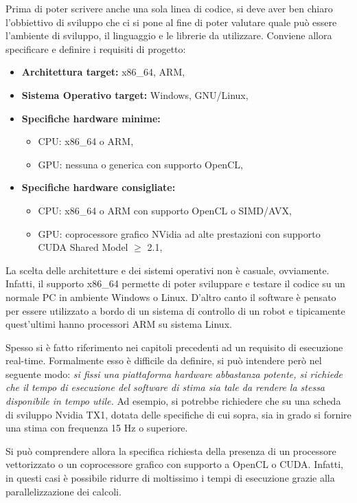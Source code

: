 Prima di poter scrivere anche una sola linea di codice, si deve aver ben chiaro l'obbiettivo di sviluppo che ci si pone al fine di poter valutare quale può essere l'ambiente di sviluppo, il linguaggio e le librerie da utilizzare.  Conviene allora specificare e definire i requisiti di progetto:
\begin{itemize}
	\item \textbf{Architettura target:}  x86\_64, ARM,
	\item \textbf{Sistema Operativo target:}  Windows, GNU/Linux,
	\item \textbf{Specifiche hardware minime:}
	\begin{itemize}
		\item CPU: x86\_64 o ARM,
		\item GPU: nessuna o generica con supporto OpenCL,
	\end{itemize} 
	\item \textbf{Specifiche hardware consigliate:}
		\begin{itemize}
			\item CPU: x86\_64 o ARM con supporto OpenCL o SIMD/AVX,
			\item GPU: coprocessore grafico NVidia ad alte prestazioni con supporto CUDA Shared Model $\ge$ 2.1,
		\end{itemize}			 
\end{itemize}

La scelta delle architetture e dei sistemi operativi non è casuale, ovviamente. Infatti, il supporto x86\_64 permette di poter sviluppare e testare il codice su un normale PC in ambiente Windows o Linux. D'altro canto il software è pensato per essere utilizzato a bordo di un sistema di controllo di un robot e tipicamente quest'ultimi hanno processori ARM su sistema Linux.

Spesso si è fatto riferimento nei capitoli precedenti ad un requisito di esecuzione real-time. Formalmente esso è difficile da definire, si può intendere però nel seguente modo: \textit{si fissi una piattaforma hardware abbastanza potente, si richiede che il tempo di esecuzione del software di stima sia tale da rendere la stessa disponibile in tempo utile.} Ad esempio, si potrebbe richiedere che su una scheda di sviluppo Nvidia TX1, dotata delle specifiche di cui sopra, sia in grado si fornire una stima con frequenza 15 Hz o superiore.
 
Si può comprendere allora la specifica richiesta della presenza di un processore vettorizzato o un coprocessore grafico con supporto a OpenCL o CUDA. Infatti, in questi casi è possibile ridurre di moltissimo i tempi di esecuzione grazie alla parallelizzazione dei calcoli.

